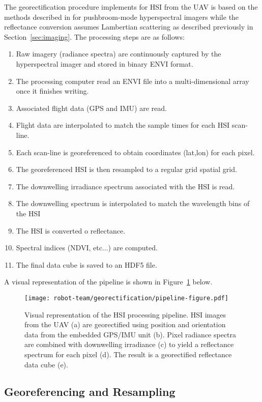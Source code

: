 The georectification procedure implements for HSI from the UAV is based on the
methods described in \cite{muller2002program, baumker2001new, mostafa2000multi}
for pushbroom-mode hyperspectral imagers while the reflectance conversion
assumes Lambertian scattering as described previously in Section~\ref{sec:imaging}.
The processing steps are as follows:

\begin{enumerate}
\item Raw imagery (radiance spectra) are continuously captured by the hyperspectral imager and stored in binary ENVI format.
\item The processing computer read an ENVI file into a multi-dimensional array
  once it finishes writing.
\item Associated flight data (GPS and IMU) are read.
\item Flight data are interpolated to match the sample times for each HSI scan-line.
\item Each scan-line is georeferenced to obtain coordinates (lat,lon) for each pixel.
\item The georeferenced HSI is then resampled to a regular grid spatial grid.
\item The downwelling irradiance spectrum associated with the HSI is read.
\item The downwelling spectrum is interpolated to match the wavelength bins of the HSI
\item The HSI is converted o reflectance.
\item Spectral indices (NDVI, etc...) are computed.
\item The final data cube is saved to an HDF5 file.
\end{enumerate}
A visual representation of the pipeline is shown in
Figure~\ref{fig:hsi-pipeline} below.
\begin{figure}[h]
  \centering
  \texttt{[image: robot-team/georectification/pipeline-figure.pdf]}
  \caption{Visual representation of the HSI processing pipeline. HSI images from
  the UAV (a) are georectified using position and orientation data from the
  embedded GPS/IMU unit (b). Pixel radiance spectra are combined with
  downwelling irradiance (c) to yield a reflectance spectrum for each pixel (d).
  The result is a georectified reflectance data cube (e).}
  \label{fig:hsi-pipeline}
\end{figure}


\subsection{Georeferencing and Resampling}

